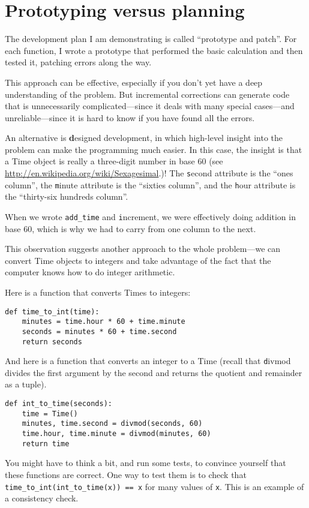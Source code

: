 \documentclass[
DIV=11,
fontsize=13,
twoside,
headinclude=false,
titlepage=firstiscover,
abstract=true,
headsepline=true,
footsepline=true,
chapterprefix=true, %
headings=big,
bibliography=totoc,%
captions=tableheading
]{scrbook}
\theoremstyle{definition}
\begin{document}
\section{Prototyping versus planning}
\label{prototype}

The development plan I am demonstrating is called ``prototype and
patch''.  For each function, I wrote a prototype that performed the
basic calculation and then tested it, patching errors along the
way.

This approach can be effective, especially if you don't yet have a
deep understanding of the problem.  But incremental corrections can
generate code that is unnecessarily complicated---since it deals with
many special cases---and unreliable---since it is hard to know if you
have found all the errors.

An alternative is {\textbf designed development}, in which high-level
insight into the problem can make the programming much easier.  In
this case, the insight is that a Time object is really a three-digit
number in base 60 (see \url{http://en.wikipedia.org/wiki/Sexagesimal}.)!  The
{\texttt second} attribute is the ``ones column'', the {\texttt minute}
attribute is the ``sixties column'', and the {\texttt hour} attribute is
the ``thirty-six hundreds column''.

When we wrote \verb"add_time" and {\texttt increment}, we were effectively
doing addition in base 60, which is why we had to carry from one
column to the next.

This observation suggests another approach to the whole problem---we
can convert Time objects to integers and take advantage of the fact
that the computer knows how to do integer arithmetic.  

Here is a function that converts Times to integers:

\begin{lstlisting}
def time_to_int(time):
    minutes = time.hour * 60 + time.minute
    seconds = minutes * 60 + time.second
    return seconds
\end{lstlisting}
%
And here is a function that converts an integer to a Time
(recall that {\texttt divmod} divides the first argument by the second
and returns the quotient and remainder as a tuple).

\begin{lstlisting}
def int_to_time(seconds):
    time = Time()
    minutes, time.second = divmod(seconds, 60)
    time.hour, time.minute = divmod(minutes, 60)
    return time
\end{lstlisting}
%
You might have to think a bit, and run some tests, to convince
yourself that these functions are correct.  One way to test them is to
check that \verb"time_to_int(int_to_time(x)) == x" for many values of
{\texttt x}.  This is an example of a consistency check.
\end{document}

